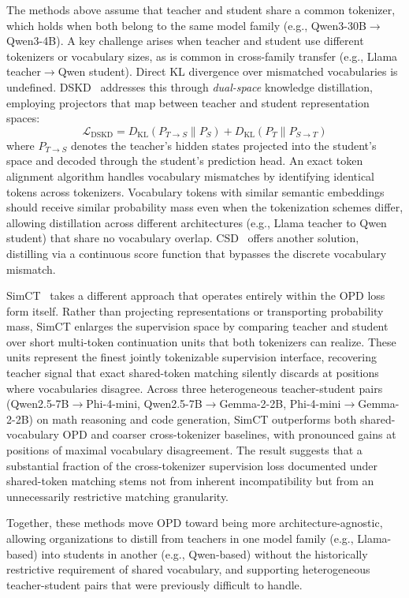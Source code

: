 \documentclass{article} %
\newcommand{\KL}{D_{\mathrm{KL}}}
\begin{document}
The methods above assume that teacher and student share a common tokenizer, which holds when both belong to the same model family (e.g., Qwen3-30B$\to$Qwen3-4B). A key challenge arises when teacher and student use different tokenizers or vocabulary sizes, as is common in cross-family transfer (e.g., Llama teacher$\to$Qwen student). Direct KL divergence over mismatched vocabularies is undefined. DSKD~\citep{2504.11426} addresses this through \emph{dual-space} knowledge distillation, employing projectors that map between teacher and student representation spaces:
\begin{equation*}
    \mathcal{L}_{\text{DSKD}} = \KL(P_{T \to S} \parallel P_S) + \KL(P_T \parallel P_{S \to T})
\end{equation*}
where $P_{T \to S}$ denotes the teacher's hidden states projected into the student's space and decoded through the student's prediction head. An exact token alignment algorithm handles vocabulary mismatches by identifying identical tokens across tokenizers. Vocabulary tokens with similar semantic embeddings should receive similar probability mass even when the tokenization schemes differ, allowing distillation across different architectures (e.g., Llama teacher to Qwen student) that share no vocabulary overlap. CSD~\citep{2509.25837} offers another solution, distilling via a continuous score function that bypasses the discrete vocabulary mismatch.

SimCT~\citep{2605.07711} takes a different approach that operates entirely within the OPD loss form itself. Rather than projecting representations or transporting probability mass, SimCT enlarges the supervision space by comparing teacher and student over short multi-token continuation units that both tokenizers can realize. These units represent the finest jointly tokenizable supervision interface, recovering teacher signal that exact shared-token matching silently discards at positions where vocabularies disagree. Across three heterogeneous teacher-student pairs (Qwen2.5-7B$\to$Phi-4-mini, Qwen2.5-7B$\to$Gemma-2-2B, Phi-4-mini$\to$Gemma-2-2B) on math reasoning and code generation, SimCT outperforms both shared-vocabulary OPD and coarser cross-tokenizer baselines, with pronounced gains at positions of maximal vocabulary disagreement. The result suggests that a substantial fraction of the cross-tokenizer supervision loss documented under shared-token matching stems not from inherent incompatibility but from an unnecessarily restrictive matching granularity.

Together, these methods move OPD toward being more architecture-agnostic, allowing organizations to distill from teachers in one model family (e.g., Llama-based) into students in another (e.g., Qwen-based) without the historically restrictive requirement of shared vocabulary, and supporting heterogeneous teacher-student pairs that were previously difficult to handle.
\end{document}
